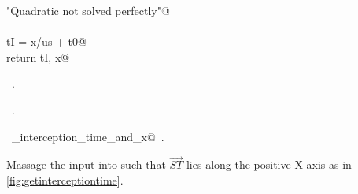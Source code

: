\documentclass[10pt, english, oneside]{report}
\begin{document}
\begin{flushleft}
\begin{minipage}{\linewidth}
\begin{list}{}{}
\mbox{}\verb@           "Quadratic not solved perfectly"@\\
\mbox{}\verb@@\\
\mbox{}\verb@    tI = x/us + t0@\\
\mbox{}\verb@    return tI, x@\\
\mbox{}\verb@@{\NWsep}
\end{list}
\vspace{-1.5ex}
\footnotesize
\begin{list}{}{\setlength{\itemsep}{-\parsep}\setlength{\itemindent}{-\leftmargin}}
\item \NWtxtMacroDefBy\ .
\item \NWtxtMacroRefIn\ .
\item \NWtxtIdentsDefed\nobreak\  \verb@get_interception_time_and_x@\nobreak\ .
\item{}
\end{list}
\end{minipage}\vspace{4ex}
\end{flushleft}

Massage the input into such that $\vec{ST}$ lies along the positive X-axis as in \autoref{fig:getinterceptiontime}. 
\end{document}
